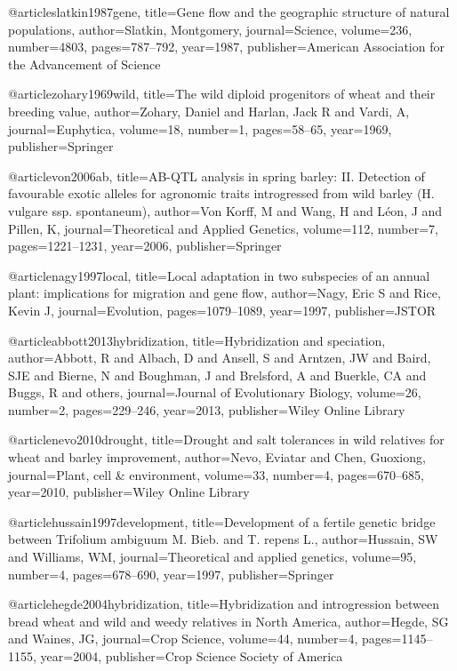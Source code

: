 @article{slatkin1987gene,
  title={Gene flow and the geographic structure of natural populations},
  author={Slatkin, Montgomery},
  journal={Science},
  volume={236},
  number={4803},
  pages={787--792},
  year={1987},
  publisher={American Association for the Advancement of Science}
}

@article{zohary1969wild,
  title={The wild diploid progenitors of wheat and their breeding value},
  author={Zohary, Daniel and Harlan, Jack R and Vardi, A},
  journal={Euphytica},
  volume={18},
  number={1},
  pages={58--65},
  year={1969},
  publisher={Springer}
}

@article{von2006ab,
  title={AB-QTL analysis in spring barley: II. Detection of favourable exotic alleles for agronomic traits introgressed from wild barley (H. vulgare ssp. spontaneum)},
  author={Von Korff, M and Wang, H and L{\'e}on, J and Pillen, K},
  journal={Theoretical and Applied Genetics},
  volume={112},
  number={7},
  pages={1221--1231},
  year={2006},
  publisher={Springer}
}

@article{nagy1997local,
  title={Local adaptation in two subspecies of an annual plant: implications for migration and gene flow},
  author={Nagy, Eric S and Rice, Kevin J},
  journal={Evolution},
  pages={1079--1089},
  year={1997},
  publisher={JSTOR}
}

@article{abbott2013hybridization,
  title={Hybridization and speciation},
  author={Abbott, R and Albach, D and Ansell, S and Arntzen, JW and Baird, SJE and Bierne, N and Boughman, J and Brelsford, A and Buerkle, CA and Buggs, R and others},
  journal={Journal of Evolutionary Biology},
  volume={26},
  number={2},
  pages={229--246},
  year={2013},
  publisher={Wiley Online Library}
}

@article{nevo2010drought,
  title={Drought and salt tolerances in wild relatives for wheat and barley improvement},
  author={Nevo, Eviatar and Chen, Guoxiong},
  journal={Plant, cell \& environment},
  volume={33},
  number={4},
  pages={670--685},
  year={2010},
  publisher={Wiley Online Library}
}

@article{hussain1997development,
  title={Development of a fertile genetic bridge between Trifolium ambiguum M. Bieb. and T. repens L.},
  author={Hussain, SW and Williams, WM},
  journal={Theoretical and applied genetics},
  volume={95},
  number={4},
  pages={678--690},
  year={1997},
  publisher={Springer}
}

@article{hegde2004hybridization,
  title={Hybridization and introgression between bread wheat and wild and weedy relatives in North America},
  author={Hegde, SG and Waines, JG},
  journal={Crop Science},
  volume={44},
  number={4},
  pages={1145--1155},
  year={2004},
  publisher={Crop Science Society of America}
}

